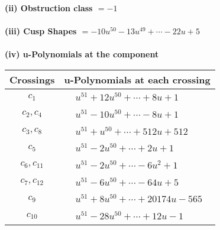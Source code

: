 \documentclass[1p]{elsarticle_modified}
\theoremstyle{definition}
\begin{document}
\flushleft \textbf{(ii) Obstruction class $= -1$}\\~\\
\flushleft \textbf{(iii) Cusp Shapes $= -10 u^{50}-13 u^{49}+\cdots-22 u+5$}\\~\\
\newpage\renewcommand{\arraystretch}{1}
\flushleft \textbf{(iv) u-Polynomials at the component}\newline \\
\begin{tabular}{m{50pt}|m{274pt}}
Crossings & \hspace{64pt}u-Polynomials at each crossing \\
\hline $$\begin{aligned}c_{1}\end{aligned}$$&$\begin{aligned}
&u^{51}+12 u^{50}+\cdots+8 u+1
\end{aligned}$\\
\hline $$\begin{aligned}c_{2},c_{4}\end{aligned}$$&$\begin{aligned}
&u^{51}-10 u^{50}+\cdots-8 u+1
\end{aligned}$\\
\hline $$\begin{aligned}c_{3},c_{8}\end{aligned}$$&$\begin{aligned}
&u^{51}+u^{50}+\cdots+512 u+512
\end{aligned}$\\
\hline $$\begin{aligned}c_{5}\end{aligned}$$&$\begin{aligned}
&u^{51}-2 u^{50}+\cdots+2 u+1
\end{aligned}$\\
\hline $$\begin{aligned}c_{6},c_{11}\end{aligned}$$&$\begin{aligned}
&u^{51}-2 u^{50}+\cdots-6 u^2+1
\end{aligned}$\\
\hline $$\begin{aligned}c_{7},c_{12}\end{aligned}$$&$\begin{aligned}
&u^{51}-6 u^{50}+\cdots-64 u+5
\end{aligned}$\\
\hline $$\begin{aligned}c_{9}\end{aligned}$$&$\begin{aligned}
&u^{51}+8 u^{50}+\cdots+20174 u-565
\end{aligned}$\\
\hline $$\begin{aligned}c_{10}\end{aligned}$$&$\begin{aligned}
&u^{51}-28 u^{50}+\cdots+12 u-1
\end{aligned}$\\
\hline
\end{tabular}\\~\\
\end{document}
